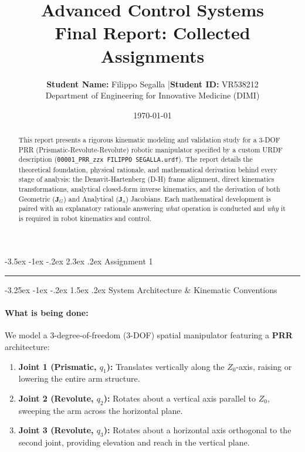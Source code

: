 \documentclass[11pt, a4paper]{article}
\title{
    \vspace{-1cm}
    \color{brandblue}\textbf{Advanced Control Systems}\\[0.3em]
    \Large\textbf{Final Report: Collected Assignments}
}
\author{\textbf{Student Name:} Filippo Segalla \quad|\quad \textbf{Student ID:} VR538212\\[0.2em]
\small Department of Engineering for Innovative Medicine (DIMI) }
\date{\today}
\makeatletter
\renewcommand{\section}{\@startsection{section}{1}{\z@}%
    {-3.5ex \@plus -1ex \@minus -.2ex}%
    {2.3ex \@plus .2ex}%
    {\normalfont\Large\bfseries\color{brandblue}}}
\renewcommand{\subsection}{\@startsection{subsection}{2}{\z@}%
    {-3.25ex \@plus -1ex \@minus -.2ex}%
    {1.5ex \@plus .2ex}%
    {\normalfont\large\bfseries\color{brandaccent}}}
\makeatother
\begin{document}
\maketitle
\thispagestyle{empty}

\tableofcontents
\newpage

\section{Assignment 1}
\label{sec:assignment1}

\begin{abstract}
\noindent
This report presents a rigorous kinematic modeling and validation study for a 3-DOF PRR (Prismatic-Revolute-Revolute) robotic manipulator specified by a custom URDF description (\texttt{00001\_PRR\_zzx FILIPPO SEGALLA.urdf}). The report details the theoretical foundation, physical rationale, and mathematical derivation behind every stage of analysis: the Denavit-Hartenberg (D-H) frame alignment, direct kinematics transformations, analytical closed-form inverse kinematics, and the derivation of both Geometric ($\mathbf{J}_G$) and Analytical ($\mathbf{J}_a$) Jacobians. Each mathematical development is paired with an explanatory rationale answering \emph{what} operation is conducted and \emph{why} it is required in robot kinematics and control.
\end{abstract}

\hrule
\vspace{1.5em}

\subsection{System Architecture \& Kinematic Conventions}
\paragraph{What is being done:}
We model a 3-degree-of-freedom (3-DOF) spatial manipulator featuring a \textbf{PRR} architecture:
\begin{enumerate}[leftmargin=1.5em]
    \item \textbf{Joint 1 (Prismatic, $q_1$):} Translates vertically along the $Z_0$-axis, raising or lowering the entire arm structure.
    \item \textbf{Joint 2 (Revolute, $q_2$):} Rotates about a vertical axis parallel to $Z_0$, sweeping the arm across the horizontal plane.
    \item \textbf{Joint 3 (Revolute, $q_3$):} Rotates about a horizontal axis orthogonal to the second joint, providing elevation and reach in the vertical plane.
\end{enumerate}
\end{document}
